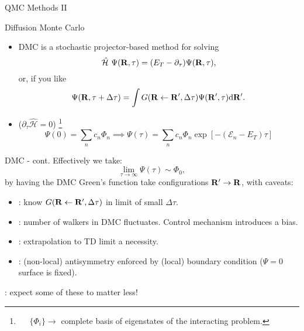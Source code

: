 \documentclass[12pt, pdf, hyperref={draft}, usenames, dvipsnames]{beamer}
\newcommand{\dd}{\mathrm{d}}
\newcommand{\red}[1]{{\bf\color{LancsRed}{#1}}}
\newcommand{\blue}[1]{{\bf\color{NavyBlue}{#1}}}
\newcommand{\green}[1]{{\bf\color{ForestGreen}{#1}}}
\begin{document}
\begin{frame}{QMC Methods II}
  \begin{block}{Diffusion Monte Carlo}
    \begin{itemize}
      \item DMC is a stochastic projector-based method for solving
      \begin{equation}
      \mathcal{\hat H}\ \Psi({\bf R}, \tau)
      = (E_T-\partial_{\tau})\Psi({\bf R}, \tau),
      \end{equation}
      or, if you like
      \begin{equation}
      \Psi({\bf R}, \tau+\Delta \tau)
      = \displaystyle\int G({\bf R} \leftarrow {\bf R'},\Delta \tau)
      \Psi({\bf R'}, \tau) \dd{\bf R'}.
      \end{equation}
      \item \green{Separable} ($\partial_\tau\mathcal{\hat H}=0$)
      \footnote{~~ $\{\Phi_i\} \rightarrow$ complete basis of eigenstates of the
      interacting problem.}
      \begin{equation}
      \Psi(0) = \sum_n c_n \Phi_n \implies
      \Psi(\tau) = \sum_n c_n \Phi_n\exp{\left[-(\mathcal{E}_n -
      E_T)\tau\right]}
      \end{equation}
    \end{itemize}
  \end{block}
\end{frame}

\begin{frame}{DMC - cont.}
  Effectively we take:
  \begin{equation}
  \lim_{\tau \rightarrow \infty} \Psi(\tau) \sim \Phi_{0},
  \end{equation}
  by having the DMC Green's function take configurations ${\bf
  R}'\rightarrow{\bf R}$, with caveats:
  \begin{itemize}
    \item \blue{Time steps}: know $G({\bf R} \leftarrow {\bf
    R'},\Delta\tau)$ in limit of small $\Delta
    \tau$.

    \item \blue{Population control}: number of walkers in DMC
    fluctuates. Control mechanism introduces a bias.

    \item \red{Finite-size (FS) effects}: extrapolation to TD limit
    a necessity.

    \item \red{Fixed-node approximation}: (non-local) antisymmetry enforced by
    (local) boundary condition ($\Psi=0$ surface is fixed).

  \end{itemize}
  \vfill
  \centering
  \green{Gaps}: expect some of these to matter less!
\end{frame}
\end{document}

